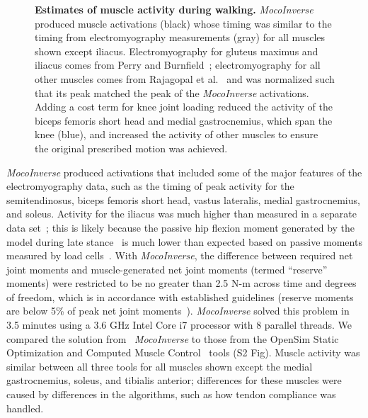 \documentclass[10pt,letterpaper]{article}
\begin{document}
\begin{figure}[!h]
    \centering
    \caption{{\bf Estimates of muscle activity during walking.}
        \textit{MocoInverse} produced muscle activations (black) whose timing was similar to the timing from electromyography measurements (gray) for all muscles shown except iliacus. Electromyography for gluteus maximus and iliacus comes from Perry and Burnfield~\cite{Perry:2010}; electromyography for all other muscles comes from Rajagopal et al.~\cite{Rajagopal:2016ek} and was normalized such that its peak matched the peak of the \textit{MocoInverse} activations. Adding a cost term for knee joint loading reduced the activity of the biceps femoris short head and medial gastrocnemius, which span the knee (blue), and increased the activity of other muscles to ensure the original prescribed motion was achieved.
    }
    \label{walking}
\end{figure}

\textit{MocoInverse} produced activations that included some of the major features of the electromyography data, such as the timing of peak activity for the semitendinosus, biceps femoris short head, vastus lateralis, medial gastrocnemius, and soleus. Activity for the iliacus was much higher than measured in a separate data set~\cite{Perry:2010}; this is likely because the passive hip flexion moment generated by the model during late stance~\cite{Rajagopal:2016ek} is much lower than expected based on passive moments measured by load cells~\cite{Whittington:2008jia}. With \textit{MocoInverse}, the difference between required net joint moments and muscle-generated net joint moments (termed ``reserve'' moments) were restricted to be no greater than 2.5 N-m across time and degrees of freedom, which is in accordance with established guidelines (reserve moments are below 5\% of peak net joint moments~\cite{Hicks:2015bo}). \textit{MocoInverse} solved this problem in 3.5 minutes using a 3.6 GHz Intel Core i7 processor with 8 parallel threads. We compared the solution from ~\textit{MocoInverse} to those from the OpenSim Static Optimization and Computed Muscle Control~\cite{Thelen:2003bba} tools (S2 Fig). Muscle activity was similar between all three tools for all muscles shown except the medial gastrocnemius, soleus, and tibialis anterior; differences for these muscles were caused by differences in the algorithms, such as how tendon compliance was handled.
\end{document}
